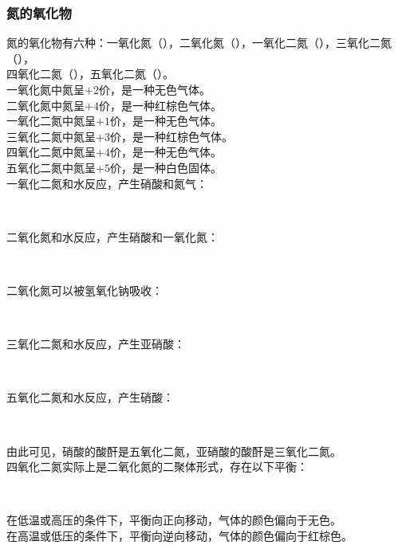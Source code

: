 \documentclass[UTF8]{ctexart}
\begin{document}
\subsubsection{氮的氧化物}
    氮的氧化物有六种：一氧化氮（），二氧化氮（），一氧化二氮（），三氧化二氮（），\\[1mm]
    四氧化二氮（），五氧化二氮（）。\\[6mm]
    一氧化氮中氮呈$+2$价，是一种无色气体。\\[3mm]
    二氧化氮中氮呈$+4$价，是一种红棕色气体。\\[6mm]
    一氧化二氮中氮呈$+1$价，是一种无色气体。\\[3mm]
    三氧化二氮中氮呈$+3$价，是一种红棕色气体。\\[3mm]
    四氧化二氮中氮呈$+4$价，是一种无色气体。\\[3mm]
    五氧化二氮中氮呈$+5$价，是一种白色固体。\\[6mm]
    一氧化二氮和水反应，产生硝酸和氮气：
    \begin{center}
        \\[4mm]
    \end{center}
    二氧化氮和水反应，产生硝酸和一氧化氮：
    \begin{center}
        \\[4mm]
    \end{center}
    二氧化氮可以被氢氧化钠吸收：
    \begin{center}
        \\[4mm]
    \end{center}
    三氧化二氮和水反应，产生亚硝酸：
    \begin{center}
        \\[4mm]
    \end{center}
    五氧化二氮和水反应，产生硝酸：
    \begin{center}
        \\[4mm]
    \end{center}
    由此可见，硝酸的酸酐是五氧化二氮，亚硝酸的酸酐是三氧化二氮。\\[10mm]
    四氧化二氮实际上是二氧化氮的二聚体形式，存在以下平衡：
    \begin{center}
        \\[4mm]
    \end{center}
    在低温或高压的条件下，平衡向正向移动，气体的颜色偏向于无色。\\[3mm]
    在高温或低压的条件下，平衡向逆向移动，气体的颜色偏向于红棕色。
\end{document}
